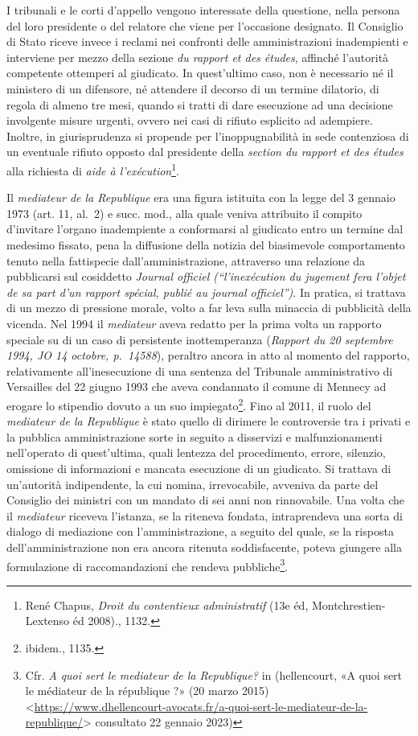\documentclass[12pt,it,a4paper,]{report}
\begin{document}
I tribunali e le corti d'appello vengono interessate della questione,
nella persona del loro presidente o del relatore che viene per
l'occasione designato. Il Consiglio di Stato riceve invece i reclami nei
confronti delle amministrazioni inadempienti e interviene per mezzo
della sezione \emph{du rapport et des études}, affinché l'autorità
competente ottemperi al giudicato. In quest'ultimo caso, non è
necessario né il ministero di un difensore, né attendere il decorso di
un termine dilatorio, di regola di almeno tre mesi, quando si tratti di
dare esecuzione ad una decisione involgente misure urgenti, ovvero nei
casi di rifiuto esplicito ad adempiere. Inoltre, in giurisprudenza si
propende per l'inoppugnabilità in sede contenziosa di un eventuale
rifiuto opposto dal presidente della \emph{section du rapport et des
études} alla richiesta di \emph{aide à l'exécution}\footnote{{René
  Chapus, \emph{Droit du contentieux administratif} (13e éd,
  {Montchrestien-Lextenso éd} 2008).}, 1132.}.

Il \emph{mediateur de la Republique} era una figura istituita con la
legge del 3 gennaio 1973 (art. 11, al.~2) e succ. mod., alla quale
veniva attribuito il compito d'invitare l'organo inadempiente a
conformarsi al giudicato entro un termine dal medesimo fissato, pena la
diffusione della notizia del biasimevole comportamento tenuto nella
fattispecie dall'amministrazione, attraverso una relazione da
pubblicarsi sul cosiddetto \emph{Journal officiel (``l'inexécution du
jugement fera l'objet de sa part d'un rapport spécial, publié au journal
officiel'')}. In pratica, si trattava di un mezzo di pressione morale,
volto a far leva sulla minaccia di pubblicità della vicenda. Nel 1994 il
\emph{mediateur} aveva redatto per la prima volta un rapporto speciale
su di un caso di persistente inottemperanza (\emph{Rapport du 20
septembre 1994, JO 14 octobre, p.~14588}), peraltro ancora in atto al
momento del rapporto, relativamente all'inesecuzione di una sentenza del
Tribunale amministrativo di Versailles del 22 giugno 1993 che aveva
condannato il comune di Mennecy ad erogare lo stipendio dovuto a un suo
impiegato\footnote{{ibidem.}, 1135.}. Fino al 2011, il ruolo del
\emph{mediateur de la Republique} è stato quello di dirimere le
controversie tra i privati e la pubblica amministrazione sorte in
seguito a disservizi e malfunzionamenti nell'operato di quest'ultima,
quali lentezza del procedimento, errore, silenzio, omissione di
informazioni e mancata esecuzione di un giudicato. Si trattava di
un'autorità indipendente, la cui nomina, irrevocabile, avveniva da parte
del Consiglio dei ministri con un mandato di sei anni non rinnovabile.
Una volta che il \emph{mediateur} riceveva l'istanza, se la riteneva
fondata, intraprendeva una sorta di dialogo di mediazione con
l'amministrazione, a seguito del quale, se la risposta
dell'amministrazione non era ancora ritenuta soddisfacente, poteva
giungere alla formulazione di raccomandazioni che rendeva
pubbliche\footnote{Cfr. \emph{A quoi sert le mediateur de la
  Republique?} in (hellencourt, {«A quoi sert le médiateur de la
  république ?»} (20 marzo 2015)
  \textless{}\url{https://www.dhellencourt-avocats.fr/a-quoi-sert-le-mediateur-de-la-republique/}\textgreater{}
  consultato 22 gennaio 2023)}.
\end{document}
